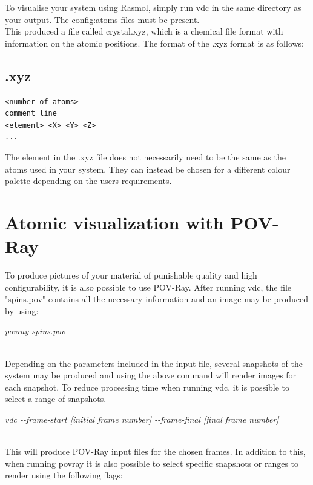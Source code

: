 To visualise your system using Rasmol, simply run vdc in the same directory as your output. The config:atoms files must be present.\\

This produced a file called crystal.xyz, which is a chemical file format with information on the atomic positions. The format of the .xyz format is as follows:\\

\subsection*{.xyz}
{\footnotesize
\begin{verbatim}
<number of atoms>
comment line
<element> <X> <Y> <Z>
...
\end{verbatim}
}

The element in the .xyz file does not necessarily need to be the same as the atoms used in your system. They can instead be chosen for a different colour palette depending on the users requirements.

\section*{Atomic visualization with POV-Ray}

To produce pictures of your material of punishable quality and high configurability, it is also possible to use POV-Ray. After running vdc, the file "spins.pov" contains all the necessary information and an image may be produced by using:

\begin{minipage}[c]{\textwidth}
\centering
\textit{povray spins.pov}
\end{minipage}\\

Depending on the parameters included in the input file, several snapshots of the system may be produced and using the above command will render images for each snapshot. To reduce processing time when running vdc, it is possible to select a range of snapshots.

\begin{minipage}[c]{\textwidth}
\centering
\textit{vdc -{}-frame-start [initial frame number] -{}-frame-final [final frame number]}
\end{minipage}\\

This will produce POV-Ray input files for the chosen frames. In addition to this, when running povray it is also possible to select specific snapshots or ranges to render using the following flags:

